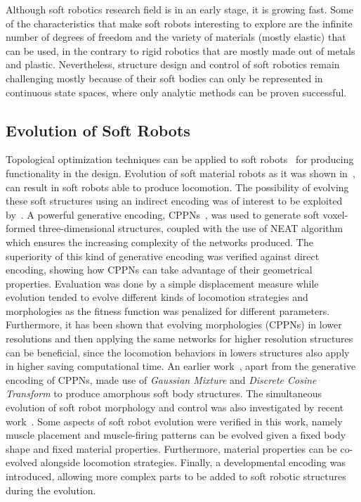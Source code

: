 \documentclass{sig-alternate}
\begin{document}
Although soft robotics research field is in an early stage, it is growing fast. Some of the characteristics that make soft robots interesting to explore are the infinite number of degrees of freedom and the variety of materials (mostly elastic) that can be used, in the contrary to rigid robotics that are mostly made out of metals and plastic. Nevertheless, structure design and control of soft robotics remain challenging mostly because of their soft bodies can only be represented in continuous state spaces, where only analytic methods can be proven successful.


\subsection{Evolution of Soft Robots}

Topological optimization techniques can be applied to soft robots~\cite{hiller2009multi} for producing functionality in the design. Evolution of soft material robots as it was shown in~\cite{hiller2012automatic}, can result in soft robots able to produce locomotion. The possibility of evolving these soft structures using an indirect encoding was of interest to be exploited by~\cite{cheney2013unshackling}. A powerful generative encoding, CPPNs~\cite{stanley2007compositional}, was used to generate soft voxel-formed three-dimensional structures, coupled with the use of NEAT algorithm which ensures the increasing complexity of the networks produced. The superiority of this kind of generative encoding was verified against direct encoding, showing how CPPNs can take advantage of their geometrical properties. Evaluation was done by a simple displacement measure while evolution tended to evolve different kinds of locomotion strategies and morphologies as the fitness function was penalized for different parameters. Furthermore, it has been shown that evolving morphologies (CPPNs) in lower resolutions and then applying the same networks for higher resolution structures can be beneficial, since the locomotion behaviors in lowers structures also apply in higher saving computational time. An earlier work~\cite{hiller2010evolving}, apart from the generative encoding of CPPNs, made use of \textit{Gaussian Mixture} and \textit{Discrete Cosine Transform} to produce amorphous soft body structures. The simultaneous evolution of soft robot morphology and control was also investigated by recent work~\cite{rieffel2014growing}. Some aspects of soft robot evolution were verified in this work, namely muscle placement and muscle-firing patterns can be evolved given a fixed body shape and fixed material properties. Furthermore, material properties can be co-evolved alongside locomotion strategies. Finally, a developmental encoding was introduced, allowing more complex parts to be added to soft robotic structures during the evolution.
\end{document}

